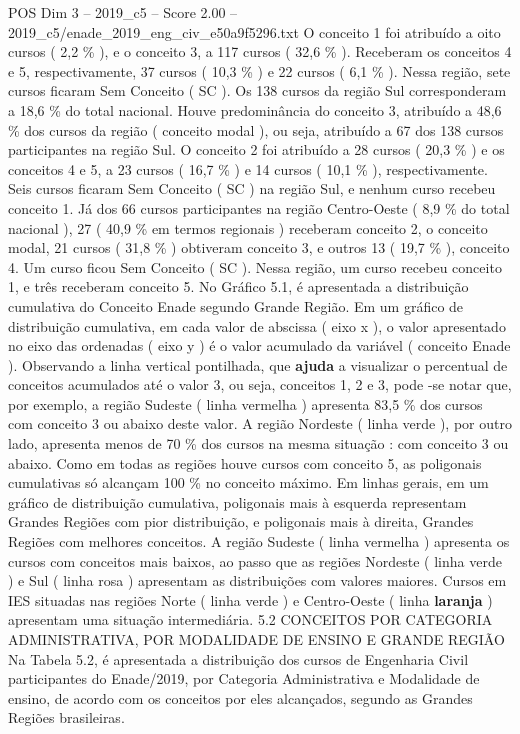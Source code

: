 \begin{textsample}{POS Dim 3 – 2019\_c5 – Score 2.00 – 2019\_c5/enade\_2019\_eng\_civ\_e50a9f5296.txt}
O conceito 1 foi atribuído a oito cursos ( 2,2 \% ), e o conceito 3, a 117 cursos ( 32,6 \% ).
Receberam os conceitos 4 e 5, respectivamente, 37 cursos ( 10,3 \% ) e 22 cursos ( 6,1 \% ).
Nessa região, sete cursos ficaram Sem Conceito ( SC ).
Os 138 cursos da região Sul corresponderam a 18,6 \% do total nacional.
Houve predominância do conceito 3, atribuído a 48,6 \% dos cursos da região ( conceito modal ), ou seja, atribuído a 67 dos 138 cursos participantes na região Sul.
O conceito 2 foi atribuído a 28 cursos ( 20,3 \% ) e os conceitos 4 e 5, a 23 cursos ( 16,7 \% ) e 14 cursos ( 10,1 \% ), respectivamente.
Seis cursos ficaram Sem Conceito ( SC ) na região Sul, e nenhum curso recebeu conceito 1.
Já dos 66 cursos participantes na região Centro-Oeste ( 8,9 \% do total nacional ), 27 ( 40,9 \% em termos regionais ) receberam conceito 2, o conceito modal, 21 cursos ( 31,8 \% ) obtiveram conceito 3, e outros 13 ( 19,7 \% ), conceito 4.
Um curso ficou Sem Conceito ( SC ).
Nessa região, um curso recebeu conceito 1, e três receberam conceito 5.
No Gráfico 5.1, é apresentada a distribuição cumulativa do Conceito Enade segundo Grande Região.
Em um gráfico de distribuição cumulativa, em cada valor de abscissa ( eixo x ), o valor apresentado no eixo das ordenadas ( eixo y ) é o valor acumulado da variável ( conceito Enade ).
Observando a linha vertical pontilhada, que \textbf{ajuda} a visualizar o percentual de conceitos acumulados até o valor 3, ou seja, conceitos 1, 2 e 3, pode -se notar que, por exemplo, a região Sudeste ( linha vermelha ) apresenta 83,5 \% dos cursos com conceito 3 ou abaixo deste valor.
A região Nordeste ( linha verde ), por outro lado, apresenta menos de 70 \% dos cursos na mesma situação : com conceito 3 ou abaixo.
Como em todas as regiões houve cursos com conceito 5, as poligonais cumulativas só alcançam 100 \% no conceito máximo.
Em linhas gerais, em um gráfico de distribuição cumulativa, poligonais mais à esquerda representam Grandes Regiões com pior distribuição, e poligonais mais à direita, Grandes Regiões com melhores conceitos.
A região Sudeste ( linha vermelha ) apresenta os cursos com conceitos mais baixos, ao passo que as regiões Nordeste ( linha verde ) e Sul ( linha rosa ) apresentam as distribuições com valores maiores.
Cursos em IES situadas nas regiões Norte ( linha verde ) e Centro-Oeste ( linha \textbf{laranja} ) apresentam uma situação intermediária. 5.2 CONCEITOS POR CATEGORIA ADMINISTRATIVA, POR MODALIDADE DE ENSINO E GRANDE REGIÃO Na Tabela 5.2, é apresentada a distribuição dos cursos de Engenharia Civil participantes do Enade/2019, por Categoria Administrativa e Modalidade de ensino, de acordo com os conceitos por eles alcançados, segundo as Grandes Regiões brasileiras.

\end{textsample}
